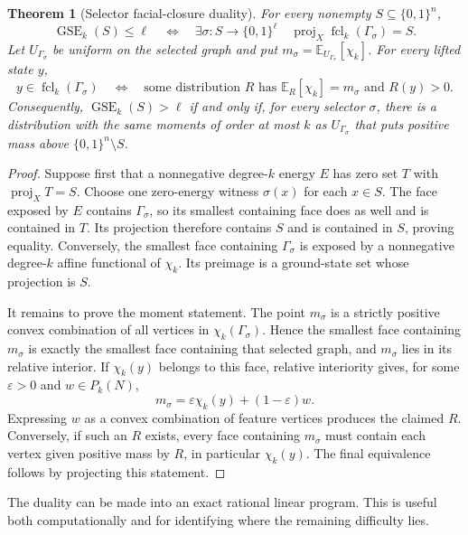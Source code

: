 \documentclass{article}
\newcommand{\GSE}{\operatorname{GSE}}
\newcommand{\fcl}{\operatorname{fcl}}
\newcommand{\E}{\mathbb{E}}
\newcommand{\bits}{\{0,1\}}
\newtheorem{theorem}{Theorem}
\begin{document}
\begin{theorem}[Selector facial-closure duality]
\label{thm:selector-closure}
For every nonempty $S\subseteq\bits^n$,
\[
  \GSE_k(S)\le\ell
  \quad\Longleftrightarrow\quad
  \exists\sigma:S\to\bits^\ell\quad
  \operatorname{proj}_X\fcl_k(\Gamma_\sigma)=S.
\]
Let $U_{\Gamma_\sigma}$ be uniform on the selected graph and put
$m_\sigma=\E_{U_{\Gamma_\sigma}}[\chi_k]$.  For every lifted state $y$,
\[
  y\in\fcl_k(\Gamma_\sigma)
  \quad\Longleftrightarrow\quad
  \text{some distribution $R$ has }
  \E_R[\chi_k]=m_\sigma\text{ and }R(y)>0.
\]
Consequently, $\GSE_k(S)>\ell$ if and only if, for every selector $\sigma$,
there is a distribution with the same moments of order at most $k$ as
$U_{\Gamma_\sigma}$ that puts positive mass above
$\bits^n\setminus S$.
\end{theorem}

\begin{proof}
Suppose first that a nonnegative degree-$k$ energy $E$ has zero set $T$ with
$\operatorname{proj}_X T=S$.  Choose one zero-energy witness $\sigma(x)$ for
each $x\in S$.  The face exposed by $E$ contains $\Gamma_\sigma$, so its
smallest containing face does as well and is contained in $T$.  Its projection
therefore contains $S$ and is contained in $S$, proving equality.  Conversely,
the smallest face containing $\Gamma_\sigma$ is exposed by a nonnegative
degree-$k$ affine functional of $\chi_k$.  Its preimage is a ground-state set
whose projection is $S$.

It remains to prove the moment statement.  The point $m_\sigma$ is a strictly
positive convex combination of all vertices in $\chi_k(\Gamma_\sigma)$.
Hence the smallest face containing $m_\sigma$ is exactly the smallest face
containing that selected graph, and $m_\sigma$ lies in its relative interior.
If $\chi_k(y)$ belongs to this face, relative interiority gives, for some
$\varepsilon>0$ and $w\in P_k(N)$,
\[
  m_\sigma=\varepsilon\chi_k(y)+(1-\varepsilon)w.
\]
Expressing $w$ as a convex combination of feature vertices produces the
claimed $R$.  Conversely, if such an $R$ exists, every face containing
$m_\sigma$ must contain each vertex given positive mass by $R$, in particular
$\chi_k(y)$.  The final equivalence follows by projecting this statement.
\end{proof}

The duality can be made into an exact rational linear program.  This is useful
both computationally and for identifying where the remaining difficulty lies.
\end{document}
